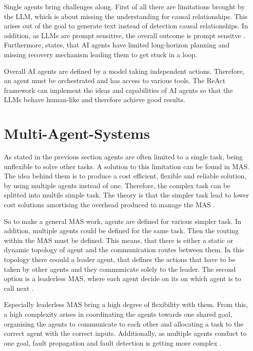 \documentclass[a4paper,oneside,bibliography=totoc]{scrbook}
\begin{document}
Single agents bring challenges along. First of all there are limitations brought by the \ac{LLM}, which is about missing the understanding for causal relationships. This arises out of the goal to generate text instead of detection causal relationships. In addition, as \acp{LLM} are prompt sensitive, the overall outcome is prompt sensitve \cite{Sapkota2025}. Furthermore, \citet{Sapkota2025} states, that \ac{AI} agents have limited long-horizon planning and missing recovery mechanism leading them to get stuck in a loop.

Overall \ac{AI} agents are defined by a model taking independent actions. Therefore, an agent must be orchestrated and has access to various tools. The ReAct framework can implement the ideas and capabilities of \ac{AI} agents so that the \acp{LLM} behave human-like and therefore achieve good results.

\section{Multi-Agent-Systems}
\label{sec:multi_agent_systems}

As stated in the previous section agents are often limited to a single task, being unflexible to solve other tasks. A solution to this limitation can be found in \ac{MAS}. The idea behind them is to produce a cost efficient, flexible and reliable solution, by using multiple agents instead of one. Therefore, the complex task can be splitted into multile simple task. The theory is that the simpler task lead to lower cost solutions amortising the overhead produced to manage the \ac{MAS} \cite{Dorri2018}.

So to make a general \ac{MAS} work, agents are defined for various simpler task. In addition, multiple agents could be defined for the same task. Then the routing within the \ac{MAS} must be defined. This means, that there is either a static or dynamic topology of agent and the communication routes between them. In this topology there coould a leader agent, that defines the actions that have to be taken by other agents and they communicate solely to the leader. The second option is a leaderless \ac{MAS}, where each agent decide on its on which agent is to call next \cite{Dorri2018}.

Especially leaderless \ac{MAS} bring a high degree of flexibility with them. From this, a high complexity arises in coordinating the agents towards one shared goal, organising the agents to communicate to each other and allocating a task to the correct agent with the correct inputs. Additionally, as multiple agents conduct to one goal, fault propagation and fault detection is getting more complex \cite{Dorri2018}.
\end{document}
